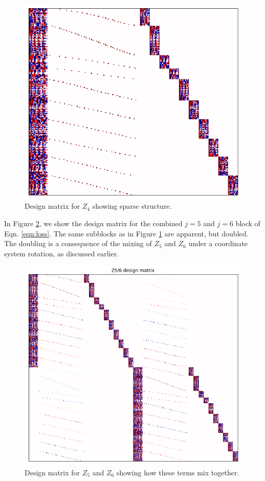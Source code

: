 \documentclass{article}
\begin{document}
\begin{figure}
    \includegraphics[width=\textwidth]{design4.png}

    \caption{Design matrix for $Z_4$ showing sparse structure.}

    \label{fig:design4}
\end{figure}

In Figure \ref{fig:design56}, we show the design matrix for the combined $j=5$
and $j=6$ block of Eqn. \ref{eqn:loss}.  The same subblocks as in Figure
\ref{fig:design4} are apparent, but doubled.  The doubling is a consequence of
the mixing of $Z_5$ and $Z_6$ under a coordinate system rotation, as discussed
earlier.

\begin{figure}
    \includegraphics[width=\textwidth]{design56.png}

    \caption{Design matrix for $Z_5$ and $Z_6$ showing how these terms mix
    together.}

    \label{fig:design56}
\end{figure}
\end{document}
